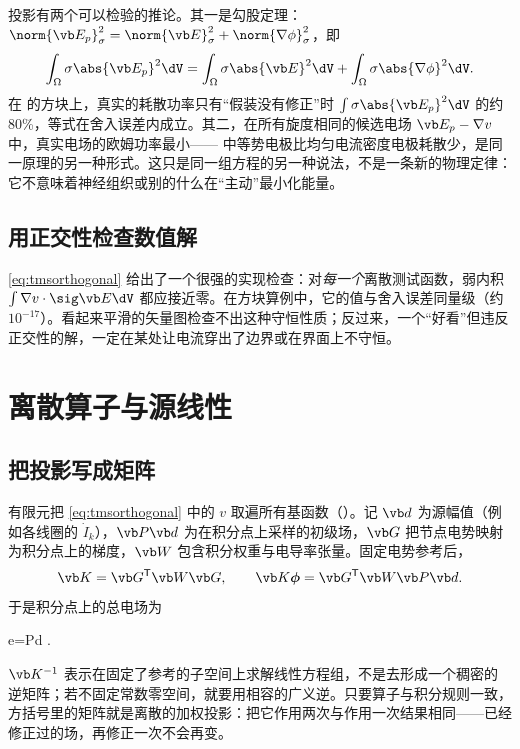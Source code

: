 投影有两个可以检验的推论。其一是勾股定理：$\norm{\vb E_p}_\sigma^2=\norm{\vb E}_\sigma^2+\norm{\nabla\phi}_\sigma^2$，即
\begin{equation}
\int_\Omega\sigma\abs{\vb E_p}^2\dV=\int_\Omega\sigma\abs{\vb E}^2\dV+\int_\Omega\sigma\abs{\nabla\phi}^2\dV .
\end{equation}
在 的方块上，真实的耗散功率只有“假装没有修正”时 $\int\sigma\abs{\vb E_p}^2\dV$ 的约 80\%，等式在舍入误差内成立。其二，在所有旋度相同的候选电场 $\vb E_p-\nabla v$ 中，真实电场的欧姆功率最小—— 中等势电极比均匀电流密度电极耗散少，是同一原理的另一种形式。这只是同一组方程的另一种说法，不是一条新的物理定律：它不意味着神经组织或别的什么在“主动”最小化能量。

\subsection{用正交性检查数值解}
\eqref{eq:tmsorthogonal} 给出了一个很强的实现检查：对\emph{每一个}离散测试函数，弱内积 $\int\nabla v\cdot\sig\vb E\dV$ 都应接近零。在方块算例中，它的值与舍入误差同量级（约 $10^{-17}$）。看起来平滑的矢量图检查不出这种守恒性质；反过来，一个“好看”但违反正交性的解，一定在某处让电流穿出了边界或在界面上不守恒。


\section{离散算子与源线性}\label{sec:tms-operator}

\subsection{把投影写成矩阵}
有限元把 \eqref{eq:tmsorthogonal} 中的 $v$ 取遍所有基函数（）。记 $\vb d$ 为源幅值（例如各线圈的 $\dot I_k$），$\vb P\vb d$ 为在积分点上采样的初级场，$\vb G$ 把节点电势映射为积分点上的梯度，$\vb W$ 包含积分权重与电导率张量。固定电势参考后，
\begin{equation}
\vb K=\vb G^{\mathsf T}\vb W\vb G,\qquad \vb K\boldsymbol\phi=\vb G^{\mathsf T}\vb W\vb P\vb d .
\end{equation}
于是积分点上的总电场为
\begin{keyeq}
\vb e=\vb P\vb d .
\label{eq:tmsoperator}
\end{keyeq}
$\vb K^{-1}$ 表示在固定了参考的子空间上求解线性方程组，不是去形成一个稠密的逆矩阵；若不固定常数零空间，就要用相容的广义逆。只要算子与积分规则一致，方括号里的矩阵就是离散的加权投影：把它作用两次与作用一次结果相同——已经修正过的场，再修正一次不会再变。


